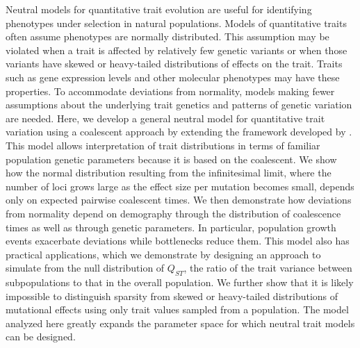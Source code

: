 Neutral models for quantitative trait evolution are useful for identifying
phenotypes under selection in natural populations. Models of quantitative traits
often assume phenotypes are normally distributed. This assumption may be
violated when a trait is affected by relatively few genetic variants or when
those variants have skewed or heavy-tailed distributions of effects on the
trait. Traits such as gene expression levels and other molecular phenotypes may
have these properties. To accommodate deviations from normality, models making
fewer assumptions about the underlying trait genetics and patterns of genetic
variation are needed. Here, we develop a general neutral model for quantitative
trait variation using a coalescent approach by extending the framework developed
by \citet{Schraiber2015}. This model allows interpretation of trait
distributions in terms of familiar population genetic parameters because it is
based on the coalescent. We show how the normal distribution resulting from the
infinitesimal limit, where the number of loci grows large as the effect size per
mutation becomes small, depends only on expected pairwise coalescent times. We
then demonstrate how deviations from normality depend on demography through the
distribution of coalescence times as well as through genetic parameters. In
particular, population growth events exacerbate deviations while bottlenecks
reduce them. This model also has practical applications, which we demonstrate by
designing an approach to simulate from the null distribution of $Q_{ST}$, the
ratio of the trait variance between subpopulations to that in the overall
population. We further show that it is likely impossible to distinguish sparsity
from skewed or heavy-tailed distributions of mutational effects using only trait
values sampled from a population. The model analyzed here greatly expands the
parameter space for which neutral trait models can be designed.

